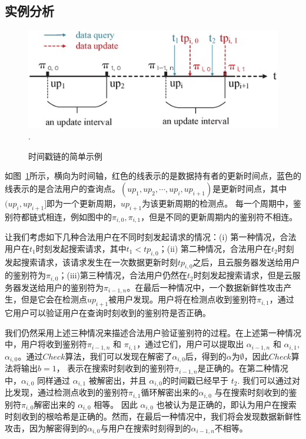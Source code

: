 
\subsection{实例分析}

\begin{figure}[htb]
  \centering
  \includegraphics[width=5 in]{fig/timestamp}
  \DeclareGraphicsExtensions.
  \caption{时间戳链的简单示例}
  \label{fig:timestamp}
\end{figure}

如图~\ref{fig:timestamp}所示，横向为时间轴，红色的线表示的是数据持有者的更新时间点，蓝色的线表示的是合法用户的查询点。$(up_1,up_2,\cdots,up_i,up_{i+1})$是更新时间点，其中$(up_i,up_{i+1}]$即为一个更新周期，$up_{i+1}$为该更新周期的检测点。
每一个周期中，鉴别符都链式相连，例如图中的$\pi_{i, 0}, \pi_{i, 1}$，但是不同的更新周期内的鉴别符不相连。

让我们考虑如下几种合法用户在不同时刻发起请求的情况：(i) 第一种情况，合法用户在$t_1$时刻发起搜索请求，其中$t_1 < tp_{i, 0}$；(ii) 第二种情况，合法用户在$t_2$时刻发起搜索请求，该请求发生在一次数据更新时刻$tp_{i, 0}$之后，且云服务器发送给用户的鉴别符为$\pi_{i, 0}$；(iii)第三种情况，合法用户仍然在$t_2$时刻发起搜索请求，但是云服务器发送给用户的鉴别符为$\pi_{i-1, n}$。在最后一种情况中，一个数据新鲜性攻击产生，但是它会在检测点$up_{i+1}$被用户发现。用户将在检测点收到鉴别符$\pi_{i, 1}$，通过它用户可以验证用户在查询时刻收到的鉴别符是否正确。

我们仍然采用上述三种情况来描述合法用户验证鉴别符的过程。在上述第一种情况中，用户将收到鉴别符$\pi_{i-1, n}$ 和 $\pi_{i, 1}$，通过它们，用户可以提取出 $\alpha_{i-1,n}$ 和 $\alpha_{i,1}$,$\alpha_{i,0}$。通过$Check$算法，我们可以发现在解密了$\alpha_{i, 0}$后，得到的$\alpha$为$\emptyset$，因此$Check$算法将输出$b=1$， 表示在搜索时刻收到的鉴别符$\pi_{i-1, n}$是正确的。在第二种情况中，$\alpha_{i, 0}$ 同样通过 $\alpha_{i, 1}$ 被解密出，并且 $\alpha_{i, 0}$的时间戳已经早于 $t_2$. 我们可以通过对比发现，通过检测点收到的鉴别符$\pi_{i, 1}$循环解密出来的$\alpha_{i, 0}$ 与在搜索时刻收到的鉴别符$\pi_{i, 0}$解密出来的 $\alpha_{i,0}$ 相等。 因此 $\alpha_{i,0}$ 也被认为是正确的，即认为用户在搜索时刻收到的根哈希是正确的。然而，在最后一种情况中，我们将会发现数据新鲜性攻击，因为解密得到的$\alpha_{i, 0}$与用户在搜索时刻得到的$\alpha_{i-1, n}$不相等。


